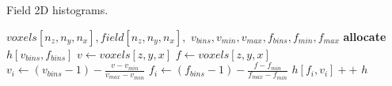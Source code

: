 
\begin{algorithm}
    \caption{Field 2D histograms.}
    \label{alg:field-hist}
    \begin{algorithmic}
         {$voxels[n_z,n_y,n_x], field[n_z,n_y,n_x],$ \newline $v_{bins}, v_{min}, v_{max}, f_{bins}, f_{min}, f_{max}$}
            \State \textbf{allocate} $h[v_{bins},f_{bins}]$
                \State $v \gets voxels[z,y,x]$
                    \State $f \gets voxels[z,y,x]$
                        \State $v_i \gets (v_{bins} - 1) - \frac{v - v_{min}}{v_{max} - v_{min}}$
                        \State $f_i \gets (f_{bins} - 1) - \frac{f - f_{min}}{f_{max} - f_{min}}$
                        \State $h[f_i,v_i]{+}{+}$
                    \EndIf
                \EndIf
            \EndFor
            \Return $h$
        \EndFunction
    \end{algorithmic}
\end{algorithm}

